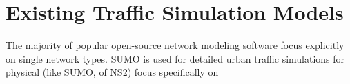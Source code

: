 \chapter{Existing Traffic Simulation Models}
\label{Related}

\par The majority of popular open-source network modeling software focus explicitly on single network types.  SUMO is used for detailed urban traffic simulations for physical 
(like SUMO, of NS2) focus specifically on 